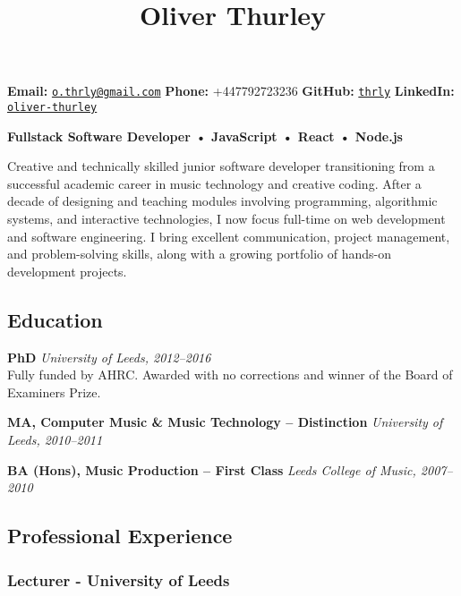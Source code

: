 \documentclass[11pt,a4paper]{article}
\title{\textcolor{devblue}{\large Oliver Thurley}}
\author{}
\date{}
\begin{document}
\maketitle

\vspace{-1em}
\noindent\textbf{Email:} \href{mailto:o.thrly@gmail.com}{\texttt{o.thrly@gmail.com}} \hspace{1em}
\textbf{Phone:} +447792723236 \hspace{1em}
\textbf{GitHub:} \href{https://github.com/thrly}{\texttt{thrly}} \hspace{1em}
\textbf{LinkedIn:} \href{https://linkedin.com/in/oliver-thurley}{\texttt{oliver-thurley}}

\vspace{1em}

\textbf{Fullstack Software Developer • JavaScript • React • Node.js}

Creative and technically skilled junior software developer transitioning
from a successful academic career in music technology and creative
coding. After a decade of designing and teaching modules involving
programming, algorithmic systems, and interactive technologies, I now
focus full-time on web development and software engineering. I bring
excellent communication, project management, and problem-solving skills,
along with a growing portfolio of hands-on development projects.

\subsection{Education}\label{education}

\textbf{PhD} \emph{University of Leeds, 2012--2016}\\
Fully funded by AHRC. Awarded with no corrections and winner of the
Board of Examiners Prize.

\textbf{MA, Computer Music \& Music Technology -- Distinction}
\emph{University of Leeds, 2010--2011}

\textbf{BA (Hons), Music Production -- First Class} \emph{Leeds College
of Music, 2007--2010}

\subsection{Professional Experience}\label{professional-experience}

\subsubsection{Lecturer - University of
Leeds}\label{lecturer---university-of-leeds}
\end{document}

